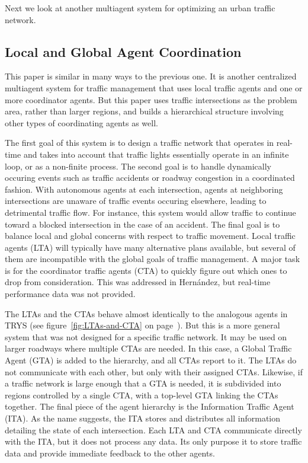 \documentclass[11pt,letterpaper,onecolumn,twoside,openright,final]{report}
\begin{document}
Next we look at another multiagent system for optimizing an urban traffic network.

\subsection{Local and Global Agent Coordination}
This paper\cite{france2003mso} is similar in many ways to the previous one.
It is another centralized multiagent system for traffic management that uses local traffic agents and one or more coordinator agents.
But this paper uses traffic intersections as the problem area, rather than larger regions, and builds a hierarchical structure involving other types of coordinating agents as well.

The first goal of this system is to design a traffic network that operates in real-time and takes into account that traffic lights essentially operate in an infinite loop, or as a non-finite process.
The second goal is to handle dynamically occuring events such as traffic accidents or roadway congestion in a coordinated fashion.
With autonomous agents at each intersection, agents at neighboring intersections are unaware of traffic events occuring elsewhere, leading to detrimental traffic flow.
For instance, this system would allow traffic to continue toward a blocked intersection in the case of an accident.
The final goal is to balance local and global concerns with respect to traffic movement.
Local traffic agents (LTA) will typically have many alternative plans available, but several of them are incompatible with the global goals of traffic management.
A major task is for the coordinator traffic agents (CTA) to quickly figure out which ones to drop from consideration.
This was addressed in Hern\'{a}ndez, but real-time performance data was not provided.

The LTAs and the CTAs behave almost identically to the analogous agents in TRYS (see figure~\ref{fig:LTAs-and-CTA} on page~\pageref{fig:LTAs-and-CTA}).
But this is a more general system that was not designed for a specific traffic network.
It may be used on larger roadways where multiple CTAs are needed.
In this case, a Global Traffic Agent (GTA) is added to the hierarchy, and all CTAs report to it.
The LTAs do not communicate with each other, but only with their assigned CTAs.
Likewise, if a traffic network is large enough that a GTA is needed, it is subdivided into regions controlled by a single CTA, with a top-level GTA linking the CTAs together.
The final piece of the agent hierarchy is the Information Traffic Agent (ITA).
As the name suggests, the ITA stores and distributes all information detailing the state of each intersection.
Each LTA and CTA communicate directly with the ITA, but it does not process any data.
Its only purpose it to store traffic data and provide immediate feedback to the other agents.
\end{document}

